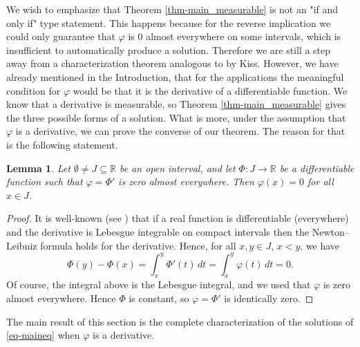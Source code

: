 \documentclass[12pt]{amsart}
\newtheorem{lemm}{Lemma}
\theoremstyle{remark}
\theoremstyle{definition}
\newcommand{\RR}{\mathbb{R}}
\newcommand{\map}{\longrightarrow}
\begin{document}
We wish to emphasize that 
Theorem \ref{thm-main_measurable} is 
not an "if and only if" type statement. 
This happens because for the reverse implication 
we could only guarantee that 
$ \varphi $ is $ 0 $ almost everywhere on some intervals, 
which is insufficient to automatically produce a solution. 
Therefore we are still a step away from a characterization 
theorem analogous to \cite[Theorem 6.]{Kis24} by Kiss. 
However, we have already mentioned 
in the Introduction, that for the applications 
the meaningful condition for $ \varphi $ 
would be that it is the derivative 
of a differentiable function. 
We know that a derivative is measurable, 
so Theorem \ref{thm-main_measurable} 
gives the three possible forms of a solution. 
What is more, 
under the assumption that $ \varphi $ is a derivative, 
we can prove the converse of our theorem. 
The reason for that is the following statement. 

\begin{lemm}\label{lemm-derivative_ae00}
Let $ \emptyset \neq J \subseteq \RR $ 
be an open interval, and let 
$ \Phi : J \map \RR $ 
be a differentiable function such that 
$ \varphi = \Phi ' $ is zero almost everywhere. 
Then $ \varphi (x) = 0 $ for all $ x \in J $. 
\end{lemm}

\begin{proof}
It is well-known (see \cite[Theorem 7.21]{Rud87}) 
that if a real function is differentiable 
(everywhere) and the derivative is Lebesgue integrable 
on compact intervals then 
the Newton--Leibniz formula holds for the derivative. 
Hence, for all $ x, y \in J $, $ x < y $, we have 
\[
\Phi(y) - \Phi(x) = 
\int_{x}^{y} \Phi ' (t) \,dt = 
\int_{x}^{y} \varphi (t) \,dt = 0.
\]
Of course, the integral above is the Lebesgue integral, 
and we used that $ \varphi $ is zero almost everywhere. 
Hence $ \Phi $ is constant, so 
$ \varphi = \Phi' $ is identically zero. 
\end{proof}

The main result of this section is the complete 
characterization of the solutions of \eqref{eq-maineq} 
when $ \varphi $ is a derivative. 
\end{document}

